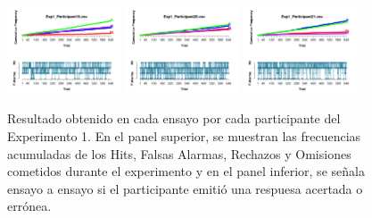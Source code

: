\begin{figure}[th]
\includegraphics[width=0.30\textwidth]{Figures/Outcome_Exp1_P19} \includegraphics[width=0.30\textwidth]{Figures/Outcome_Exp1_P20} \includegraphics[width=0.30\textwidth]{Figures/Outcome_Exp1_P21} 
\caption[Resultados obtenidos por ensayo; Experimento 1]{Resultado obtenido en cada ensayo por cada participante del Experimento 1. En el panel superior, se muestran las frecuencias acumuladas de los Hits, Falsas Alarmas, Rechazos y Omisiones cometidos durante el experimento y en el panel inferior, se señala ensayo a ensayo si el participante emitió una respuesa acertada o errónea.}
\label{fig:Outcome_E1}
\end{figure}


